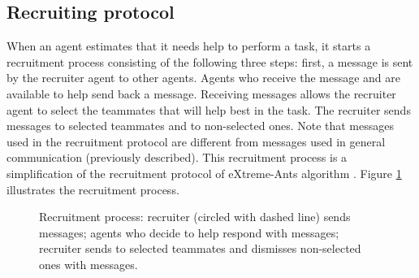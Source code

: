\subsection{Recruiting protocol}
\label{sec:recruiting}
When an agent estimates that it needs help to perform a task, it starts a recruitment process consisting of the following three steps: first, a  message is sent by the recruiter agent to other agents. Agents who receive the  message and are available to help  send back a  message. 
Receiving  messages allows the recruiter agent to select the teammates that will help best in the task. 
The recruiter sends  messages to selected teammates and  to non-selected ones.  Note that  messages used in the recruitment protocol are different from  messages used in general communication (previously described). This recruitment process is a simplification of the recruitment protocol of eXtreme-Ants algorithm \cite{Santos&Bazzan2009optmas}. Figure \ref{fig:auction} illustrates the recruitment process.

\begin{figure}[ht]
  \centering

  \caption{Recruitment process:  recruiter (circled with dashed line) sends  messages;  agents who decide to help respond with  messages;  recruiter sends  to selected teammates and dismisses non-selected ones with  messages.}

 \label{fig:auction}
\end{figure}

